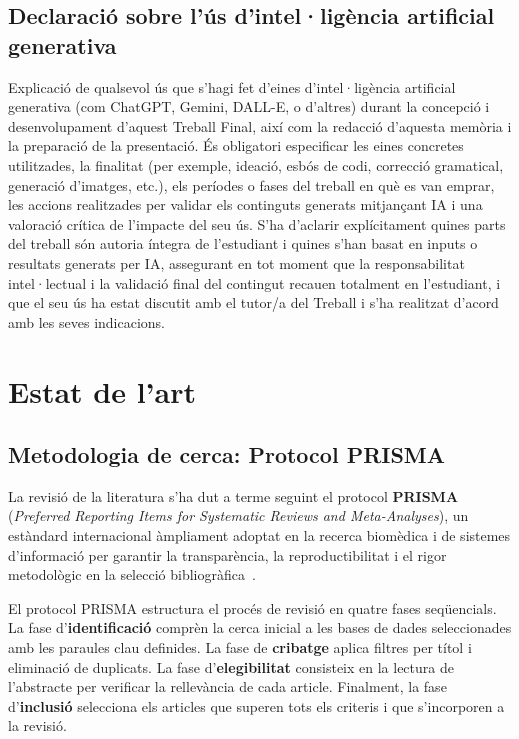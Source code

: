 \documentclass[CAT]{TFUOC}%
\begin{document}
\section{Declaració sobre l’ús d’intel·ligència artificial generativa}

Explicació de qualsevol ús que s'hagi fet d'eines d'intel·ligència artificial generativa (com ChatGPT, Gemini, DALL-E, o d'altres) durant la concepció i desenvolupament d'aquest Treball Final, així com la redacció d'aquesta memòria i la preparació de la presentació. És obligatori especificar les eines concretes utilitzades, la finalitat (per exemple, ideació, esbós de codi, correcció gramatical, generació d'imatges, etc.), els períodes o fases del treball en què es van emprar, les accions realitzades per validar els continguts generats mitjançant IA i una valoració crítica de l'impacte del seu ús. S'ha d'aclarir explícitament quines parts del treball són autoria íntegra de l'estudiant i quines s'han basat en inputs o resultats generats per IA, assegurant en tot moment que la responsabilitat intel·lectual i la validació final del contingut recauen totalment en l'estudiant, i que el seu ús ha estat discutit amb el tutor/a del Treball i s'ha realitzat d'acord amb les seves indicacions.



\chapter{Estat de l'art}

\section{Metodologia de cerca: Protocol PRISMA}

La revisió de la literatura s'ha dut a terme seguint el protocol \textbf{PRISMA} (\textit{Preferred Reporting Items for Systematic Reviews and Meta-Analyses}), un estàndard internacional àmpliament adoptat en la recerca biomèdica i de sistemes d'informació per garantir la transparència, la reproductibilitat i el rigor metodològic en la selecció bibliogràfica~\cite{page2021prisma}.

El protocol PRISMA estructura el procés de revisió en quatre fases seqüencials. La fase d'\textbf{identificació} comprèn la cerca inicial a les bases de dades seleccionades amb les paraules clau definides. La fase de \textbf{cribatge} aplica filtres per títol i eliminació de duplicats. La fase d'\textbf{elegibilitat} consisteix en la lectura de l'abstracte per verificar la rellevància de cada article. Finalment, la fase d'\textbf{inclusió} selecciona els articles que superen tots els criteris i que s'incorporen a la revisió.
\end{document}
